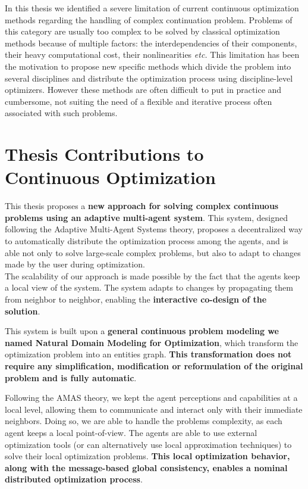 
In this thesis we identified a severe limitation of current continuous optimization methods regarding the handling of complex continuation problem. Problems of this category are usually too complex to be solved by classical optimization methods because of multiple factors: the interdependencies of their components, their heavy computational cost, their nonlinearities \emph{etc.} This limitation has been the motivation to propose new specific methods which divide the problem into several disciplines and distribute the optimization process using discipline-level optimizers. However these methods are often difficult to put in practice and cumbersome, not suiting the need of a flexible and iterative process often associated with such problems.

\section*{Thesis Contributions to Continuous Optimization}

This thesis proposes a \textbf{new approach for solving complex continuous problems using an adaptive multi-agent system}. This system, designed following the Adaptive Multi-Agent Systems theory, proposes a decentralized way to automatically distribute the optimization process among the agents, and is able not only to solve large-scale complex problems, but also to adapt to changes made by the user during optimization.\\
The scalability of our approach is made possible by the fact that the agents keep a local view of the system. The system adapts to changes by propagating them from neighbor to neighbor, enabling the \textbf{interactive co-design of the solution}.

This system is built upon a \textbf{general continuous problem modeling we named Natural Domain Modeling for Optimization}, which transform the optimization problem into an entities graph. \textbf{This transformation does not require any simplification, modification or reformulation of the original problem and is fully automatic}.

Following the AMAS theory, we kept the agent perceptions and capabilities at a local level, allowing them to communicate and interact only with their immediate neighbors. Doing so, we are able to handle the problems complexity, as each agent keeps a local point-of-view. The agents are able to use external optimization tools (or can alternatively use local approximation techniques) to solve their local optimization problems. \textbf{This local optimization behavior, along with the message-based global consistency, enables a nominal distributed optimization process}.

